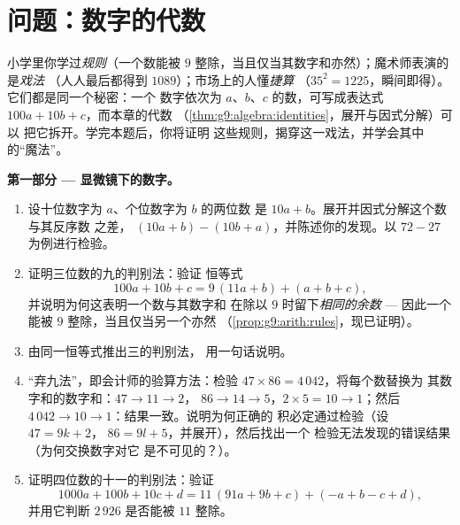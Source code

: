 \section{问题：数字的代数}

\begin{problem}
\label{pb:g9:algebra:1}
小学里你学过\emph{规则}（一个数能被
$9$ 整除，当且仅当其数字和亦然）；魔术师表演的是\emph{戏法}
（人人最后都得到 $1089$）；市场上的人懂\emph{捷算}
（$35^2 = 1225$，瞬间即得）。它们都是同一个秘密：一个
数字依次为 $a$、$b$、$c$ 的数，可写成表达式
$100a + 10b + c$，而本章的代数
（\cref{thm:g9:algebra:identities}，展开与因式分解）可以
把它拆开。学完本题后，你将证明
这些规则，揭穿这一戏法，并学会其中的“魔法”。

\medskip
\noindent\textbf{第一部分 --- 显微镜下的数字。}
\begin{enumerate}
  \item 设十位数字为 $a$、个位数字为 $b$ 的两位数
        是 $10a + b$。展开并因式分解这个数与其反序数
        之差，
        $(10a + b) - (10b + a)$，并陈述你的发现。以
        $72 - 27$ 为例进行检验。
  \item 证明三位数的九的判别法：验证
        恒等式
        \[
        100a + 10b + c = 9\,(11a + b) + (a + b + c),
        \]
        并说明为何这表明一个数与其数字和
        在除以 $9$ 时留下\emph{相同的余数}
        --- 因此一个能被 $9$ 整除，当且仅当另一个亦然
        （\cref{prop:g9:arith:rules}，现已证明）。
  \item 由同一恒等式推出三的判别法，
        用一句话说明。
  \item “弃九法”，即会计师的验算方法：检验
        $47 \times 86 = 4\,042$，将每个数替换为
        其数字和的数字和：$47 \to 11 \to 2$，
        $86 \to 14 \to 5$，$2 \times 5 = 10 \to 1$；然后
        $4\,042 \to 10 \to 1$：结果一致。说明为何正确的
        积必定通过检验（设 $47 = 9k + 2$，
        $86 = 9l + 5$，并展开），然后找出一个
        检验无法发现的错误结果（为何交换数字对它
        是不可见的？）。
  \item 证明四位数的十一的判别法：验证
        \[
        1000a + 100b + 10c + d
        = 11\,(91a + 9b + c) + (- a + b - c + d),
        \]
        并用它判断 $2\,926$ 是否能被
        $11$ 整除。
\end{enumerate}


\end{problem}
